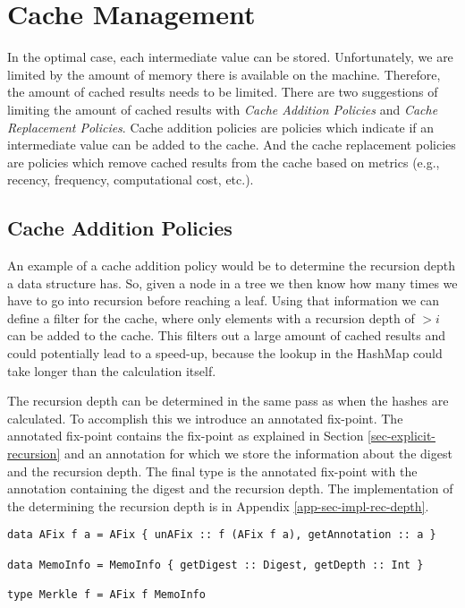 \section{Cache Management}
\label{sec-cache-manage}

In the optimal case, each intermediate value can be stored. Unfortunately, we are limited by the amount of memory there is available on the machine. Therefore, the amount of cached results needs to be limited. There are two suggestions of limiting the amount of cached results with \textit{Cache Addition Policies} and \textit{Cache Replacement Policies}. Cache addition policies are policies which indicate if an intermediate value can be added to the cache. And the cache replacement policies are policies which remove cached results from the cache based on metrics (e.g., recency, frequency, computational cost, etc.). 

\subsection{Cache Addition Policies}

An example of a cache addition policy would be to determine the recursion depth a data structure has. So, given a node in a tree we then know how many times we have to go into recursion before reaching a leaf. Using that information we can define a filter for the cache, where only elements with a recursion depth of $>i$ can be added to the cache. This filters out a large amount of cached results and could potentially lead to a speed-up, because the lookup in the HashMap could take longer than the calculation itself. 

The recursion depth can be determined in the same pass as when the hashes are calculated. To accomplish this we introduce an annotated fix-point. The annotated fix-point contains the fix-point as explained in Section \ref*{sec-explicit-recursion} and an annotation for which we store the information about the digest and the recursion depth. The final  type is the annotated fix-point with the annotation containing the digest and the recursion depth. The implementation of the determining the recursion depth is in Appendix \ref*{app-sec-impl-rec-depth}.

\begin{verbatim}
data AFix f a = AFix { unAFix :: f (AFix f a), getAnnotation :: a }

data MemoInfo = MemoInfo { getDigest :: Digest, getDepth :: Int }

type Merkle f = AFix f MemoInfo
\end{verbatim}

